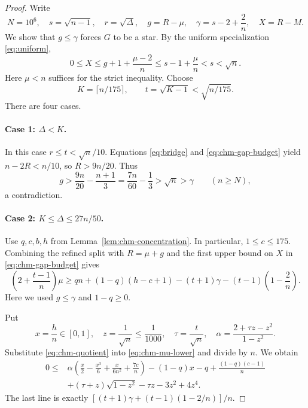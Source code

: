 \documentclass[11pt,a4paper]{article}
\theoremstyle{remark}\newtheorem{remark}[theorem]{Remark}
\begin{document}
\begin{proof}
Write
\[
 N=10^6,\quad s=\sqrt{n-1},\quad r=\sqrt\Delta,\quad
 g=R-\mu,\quad \gamma=s-2+\frac2n,\quad X=R-M.
\]
We show that $g\le\gamma$ forces $G$ to be a star. By the uniform
specialization \eqref{eq:uniform},
\begin{equation}\label{eq:chm-gap-budget}
 0\le X\le g+1+\frac{\mu-2}{n}
       \le s-1+\frac\mu n<s<\sqrt n.
\end{equation}
Here $\mu<n$ suffices for the strict inequality. Choose
\[
 K=\lceil n/175\rceil,\qquad t=\sqrt{K-1}<\sqrt{n/175}.
\]
There are four cases.

\paragraph{Case 1: $\Delta<K$.}
In this case $r\le t<\sqrt n/10$. Equations
\eqref{eq:bridge} and \eqref{eq:chm-gap-budget} yield
$n-2R<n/10$, so $R>9n/20$. Thus
\[
 g>\frac{9n}{20}-\frac{n+1}{3}
   =\frac{7n}{60}-\frac13>\sqrt n>\gamma
 \qquad(n\ge N),
\]
a contradiction.

\paragraph{Case 2: $K\le\Delta\le27n/50$.}
Use $q,c,b,h$ from Lemma~\ref{lem:chm-concentration}. In particular,
$1\le c\le175$. Combining the refined split with
$R=\mu+g$ and the first upper bound on $X$ in
\eqref{eq:chm-gap-budget} gives
\begin{equation}\label{eq:chm-mu-lower}
 \left(2+\frac{t-1}{n}\right)\mu
 \ge qn+(1-q)(h-c+1)
       -(t+1)\gamma-(t-1)\left(1-\frac2n\right).
\end{equation}
Here we used $g\le\gamma$ and $1-q\ge0$.

Put
\[
 x=\frac hn\in[0,1],\quad z=\frac1{\sqrt n}\le\frac1{1000},
 \quad\tau=\frac t{\sqrt n},\quad
 \alpha=\frac{2+\tau z-z^2}{1-z^2}.
\]
Substitute \eqref{eq:chm-quotient} into
\eqref{eq:chm-mu-lower} and divide by $n$. We obtain
\begin{align}
 0\le{}&\alpha\left(\frac x2-\frac{x^3}{6}
                         +\frac{x}{6n^2}+\frac{7c}{n}\right)
             -(1-q)x-q+\frac{(1-q)(c-1)}n\nonumber\\
       &+(\tau+z)\sqrt{1-z^2}-\tau z-3z^2+4z^4.
       \label{eq:chm-cubic-exact}
\end{align}
The last line is exactly
$[(t+1)\gamma+(t-1)(1-2/n)]/n$.


\end{proof}
\end{document}
